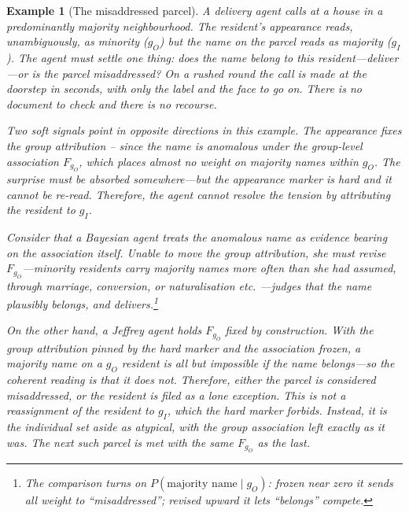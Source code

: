 \documentclass[pdflatex,sn-basic]{sn-jnl}
\theoremstyle{thmstyleone}
\newtheorem{example}[proposition]{Example}
\numberwithin{proposition}{subsection}
\begin{document}
\begin{example}[The misaddressed parcel]
\label{ex:misaddressed}
A delivery agent calls at a house in a predominantly majority
neighbourhood. The resident's appearance reads, unambiguously, as
minority ($g_O$) but the name on the parcel reads as majority ($g_I$). The
agent must settle one thing: does the name belong to this
resident---deliver---or is the parcel misaddressed? On a rushed round the
call is made at the doorstep in seconds, with only the label and the face
to go on. There is no document to check and there is no recourse.

Two soft signals point in opposite directions in this example. The appearance fixes the
group attribution -- since the name is anomalous under the group-level
association $F_{g_O}$, which places almost no weight on majority names
within $g_O$. The surprise must be absorbed somewhere---but the
appearance marker is \emph{hard} and it cannot be re-read. Therefore, the agent
cannot resolve the tension by attributing the resident to $g_I$.

Consider that a Bayesian agent treats the anomalous name as evidence bearing on the
association itself. Unable to move the group attribution, she must revise
$F_{g_O}$---minority residents carry majority names more often than she
had assumed, through marriage, conversion, or naturalisation etc. ---judges
that the name plausibly belongs, and delivers.\footnote{The comparison
turns on $P(\text{majority name}\mid g_O)$: frozen near zero it sends all
weight to ``misaddressed''; revised upward it lets ``belongs'' compete.}

On the other hand, a Jeffrey agent holds $F_{g_O}$ fixed by construction. With the group
attribution pinned by the hard marker and the association frozen, a
majority name on a $g_O$ resident is all but impossible \emph{if the name
belongs}---so the coherent reading is that it does not. Therefore, either the parcel is
considered misaddressed, or the resident is filed as a lone exception. This is not a
reassignment of the resident to $g_I$, which the hard marker forbids. Instead, it
is the individual set aside as atypical, with the group association left
exactly as it was. The next such parcel is met with the same $F_{g_O}$ as
the last.
\end{example}
\end{document}
